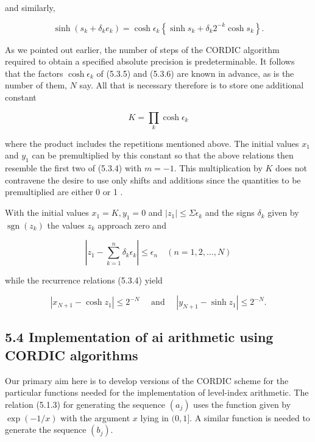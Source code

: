 \documentclass[10pt]{article}
\begin{document}
and similarly,


\begin{equation*}
\sinh \left(s_{k}+\delta_{k} e_{k}\right)=\cosh \epsilon_{k}\left\{\sinh s_{k}+\delta_{k} 2^{-k} \cosh s_{k}\right\} . \tag{5.3.6}
\end{equation*}


As we pointed out earlier, the number of steps of the CORDIC algorithm required to obtain a specified absolute precision is predeterminable. It follows that the factors $\cosh \epsilon_{k}$ of (5.3.5) and (5.3.6) are known in advance, as is the number of them, $N$ say. All that is necessary therefore is to store one additional constant

$$
K=\prod_{k} \cosh \epsilon_{k}
$$

where the product includes the repetitions mentioned above. The initial values $x_{1}$ and $y_{1}$ can be premultiplied by this constant so that the above relations then resemble the first two of (5.3.4) with $m=-1$. This multiplication by $K$ does not contravene the desire to use only shifts and additions since the quantities to be premultiplied are either 0 or 1 .

With the initial values $x_{1}=K, y_{1}=0$ and $\left|z_{1}\right| \leqslant \Sigma \epsilon_{k}$ and the signs $\delta_{k}$ given by $\operatorname{sgn}\left(z_{k}\right)$ the values $z_{k}$ approach zero and


\begin{equation*}
\left|z_{1}-\sum_{k=1}^{n} \delta_{k} \epsilon_{k}\right| \leqslant \epsilon_{n} \quad(n=1,2, \ldots, N) \tag{5.3.7}
\end{equation*}


while the recurrence relations (5.3.4) yield


\begin{equation*}
\left|x_{N+1}-\cosh z_{1}\right| \leqslant 2^{-N} \quad \text { and } \quad\left|y_{N+1}-\sinh z_{1}\right| \leqslant 2^{-N} . \tag{5.3.8}
\end{equation*}


\subsection*{5.4 Implementation of ai arithmetic using CORDIC algorithms}
Our primary aim here is to develop versions of the CORDIC scheme for the particular functions needed for the implementation of level-index arithmetic. The relation (5.1.3) for generating the sequence $\left(a_{j}\right)$ uses the function given by $\exp (-1 / x)$ with the argument $x$ lying in $(0,1]$. A similar function is needed to generate the sequence $\left(b_{j}\right)$.
\end{document}
